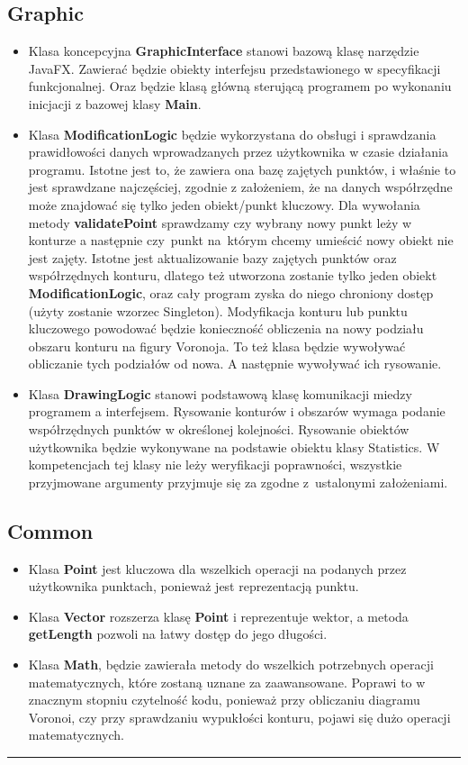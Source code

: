 \documentclass[a4paper,11pt]{article}
\newcommand{\linia}{\rule{\linewidth}{0.4mm}}
\begin{document}
\subsection{Graphic}
\begin{itemize}
\item Klasa koncepcyjna \textbf{GraphicInterface} stanowi bazową klasę narzędzie JavaFX. Zawierać będzie obiekty interfejsu przedstawionego w specyfikacji funkcjonalnej. Oraz będzie klasą główną sterującą programem po wykonaniu inicjacji z bazowej klasy \textbf{Main}.
\item Klasa \textbf{ModificationLogic} będzie wykorzystana do obsługi i sprawdzania prawidłowości danych wprowadzanych przez użytkownika w czasie działania programu. Istotne jest to, że zawiera ona bazę zajętych punktów, i właśnie to jest sprawdzane najczęściej, zgodnie z założeniem, że na danych współrzędne może znajdować się tylko jeden obiekt/punkt kluczowy. Dla wywołania metody \textbf{validatePoint} sprawdzamy czy wybrany nowy punkt leży w konturze a następnie czy~punkt na~którym chcemy umieścić nowy obiekt nie jest zajęty. Istotne jest aktualizowanie bazy zajętych punktów oraz współrzędnych konturu, dlatego też utworzona zostanie tylko jeden obiekt \textbf{ModificationLogic}, oraz cały program zyska do niego chroniony dostęp (użyty zostanie wzorzec Singleton). Modyfikacja konturu lub punktu kluczowego powodować będzie konieczność obliczenia na nowy podziału obszaru konturu na figury Voronoja. To też klasa będzie wywoływać obliczanie tych podziałów od nowa. A następnie wywoływać ich rysowanie.
\item Klasa \textbf{DrawingLogic} stanowi podstawową klasę komunikacji miedzy programem a interfejsem. Rysowanie konturów i obszarów wymaga podanie współrzędnych punktów w określonej kolejności. Rysowanie obiektów użytkownika będzie wykonywane na podstawie obiektu klasy Statistics. W kompetencjach tej klasy nie leży weryfikacji poprawności, wszystkie przyjmowane argumenty przyjmuje się za zgodne z~ustalonymi założeniami. 
\end{itemize}

\subsection{Common}
\begin{itemize}
\item Klasa \textbf{Point} jest kluczowa dla wszelkich operacji na podanych przez użytkownika punktach, ponieważ jest reprezentacją punktu.
\item Klasa \textbf{Vector} rozszerza klasę \textbf{Point} i reprezentuje wektor, a metoda \textbf{getLength} pozwoli na łatwy dostęp do jego długości.
\item Klasa \textbf{Math}, będzie zawierała metody do wszelkich potrzebnych operacji matematycznych, które zostaną uznane za zaawansowane. Poprawi to w znacznym stopniu czytelność kodu, ponieważ przy obliczaniu diagramu Voronoi, czy przy sprawdzaniu wypukłości konturu, pojawi się dużo operacji matematycznych.
\end{itemize}
\noindent\linia
\end{document}
